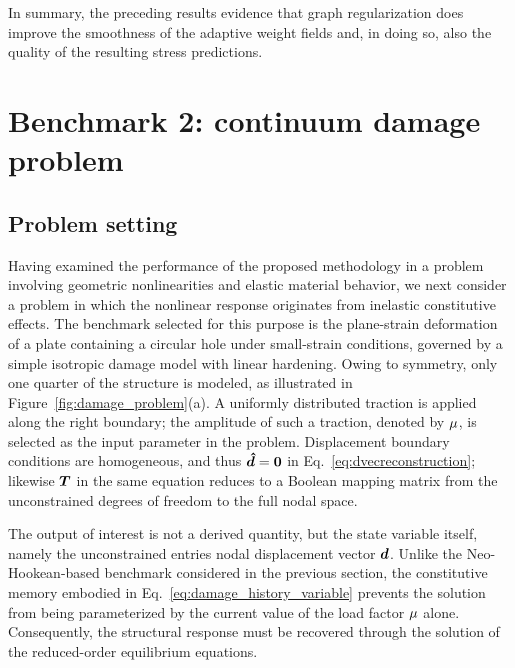\documentclass[preprint,10pt]{elsarticle}  %
\begin{document}
In summary, the preceding results evidence that graph regularization does improve the smoothness of the adaptive weight fields and, in doing so, also the quality of the resulting stress predictions.







\section{Benchmark 2: continuum damage problem}
\label{sec:DamageProblem}
\subsection{Problem setting}
\label{sec:probsetting_2}
Having examined the performance of the proposed methodology in a
problem involving geometric nonlinearities and elastic material
behavior, we next consider a problem in which the nonlinear response
originates from inelastic constitutive effects. The benchmark selected
for this purpose is the plane-strain deformation of a plate containing
a circular hole under small-strain conditions, governed by a simple
isotropic damage model with linear hardening.  Owing to symmetry, only one quarter of the structure is
modeled, as illustrated in Figure~\ref{fig:damage_problem}(a).   A uniformly distributed traction is applied along the right boundary;  the amplitude of such a  traction, denoted by \(\mu\), is selected as
the input parameter in the problem. Displacement boundary conditions are homogeneous, and thus $\bm{\hat{d}} = \boldsymbol{0}$ in Eq.~\eqref{eq:dvecreconstruction}; likewise $\bm{T}$ in the same equation reduces to  a Boolean mapping matrix from the
unconstrained degrees of freedom to the full nodal space.





The output of interest is not a derived quantity, but the state variable itself, namely the unconstrained entries
nodal displacement vector $\bm{d}$. Unlike the Neo-Hookean-based benchmark considered in the previous
section, the constitutive memory embodied in
Eq.~\eqref{eq:damage_history_variable} prevents the solution from being
parameterized by the current value of the load factor \(\mu\)
alone. Consequently, the structural response must be recovered through
the solution of the reduced-order equilibrium equations.
\end{document}
